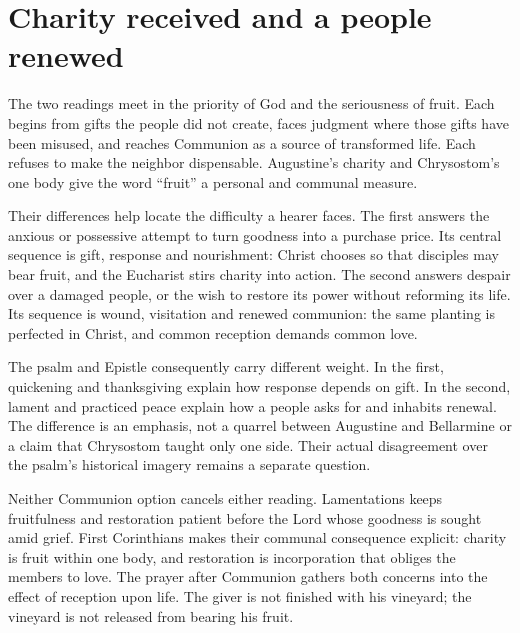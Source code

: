 \section{Charity received and a people renewed}
The two readings meet in the priority of God and the seriousness of fruit. Each begins from gifts the people did not create, faces judgment where those gifts have been misused, and reaches Communion as a source of transformed life. Each refuses to make the neighbor dispensable. Augustine's charity and Chrysostom's one body give the word ``fruit'' a personal and communal measure.

Their differences help locate the difficulty a hearer faces. The first answers the anxious or possessive attempt to turn goodness into a purchase price. Its central sequence is gift, response and nourishment: Christ chooses so that disciples may bear fruit, and the Eucharist stirs charity into action. The second answers despair over a damaged people, or the wish to restore its power without reforming its life. Its sequence is wound, visitation and renewed communion: the same planting is perfected in Christ, and common reception demands common love.

The psalm and Epistle consequently carry different weight. In the first, quickening and thanksgiving explain how response depends on gift. In the second, lament and practiced peace explain how a people asks for and inhabits renewal. The difference is an emphasis, not a quarrel between Augustine and Bellarmine or a claim that Chrysostom taught only one side. Their actual disagreement over the psalm's historical imagery remains a separate question.

Neither Communion option cancels either reading. Lamentations keeps fruitfulness and restoration patient before the Lord whose goodness is sought amid grief. First Corinthians makes their communal consequence explicit: charity is fruit within one body, and restoration is incorporation that obliges the members to love. The prayer after Communion gathers both concerns into the effect of reception upon life. The giver is not finished with his vineyard; the vineyard is not released from bearing his fruit.
